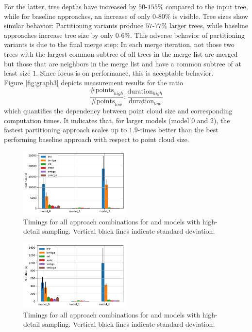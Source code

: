For the latter, tree depths have increased by $50$-$155\%$ compared to the input tree, while for baseline approaches, an increase of only $0$-$80\%$ is visible.
Tree sizes show similar behavior:
Partitioning variants produce $57$-$77\%$ larger trees, while baseline approaches increase tree size by only $0$-$6\%$.
This adverse behavior of partitioning variants is due to the final merge step:
In each merge iteration, not those two trees with the largest common subtree of all trees in the merge list are merged but those that are neighbors in the merge list and have a common subtree of at least size $1$.
Since focus is on performance, this is acceptable behavior.
\\
Figure \ref{fig:graph3} depicts measurement results for the ratio
\begin{equation} \label{eq:ratio}
\frac{\#\text{points}_{high}}{\#\text{points}_{low}} : \frac{\text{duration}_{high}}{\text{duration}_{low}}
\end{equation}
which quantifies the dependency between point cloud size and corresponding computation times.
It indicates that, for larger models (model $0$ and $2$), the fastest partitioning approach scales up to $1.9$-times better than the best performing baseline approach with respect to point cloud size.
\begin{figure}[htb]
	\centering
	\includegraphics[width=0.5\textwidth]{figures/g1.pdf}
	\caption{Timings for all approach combinations for and models with high-detail sampling. Vertical black lines indicate standard deviation.}
	\label{fig:graph1}
\end{figure}
\begin{figure}[htb]
	\centering
	\includegraphics[width=0.5\textwidth]{figures/g4.pdf}
	\caption{Timings for all approach combinations for and models with high-detail sampling. Vertical black lines indicate standard deviation.}
	\label{fig:graph4}
\end{figure}
